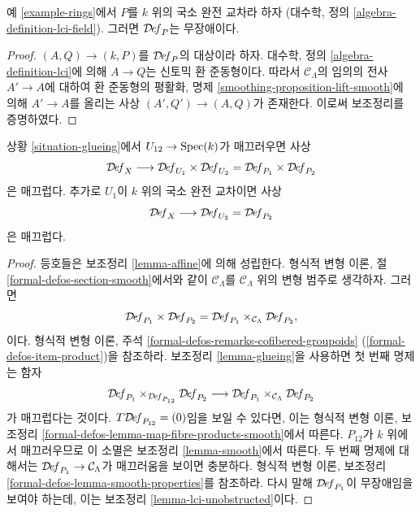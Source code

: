\begin{lemma}
\label{lemma-lci-unobstructed}
예 \ref{example-rings}에서 $P$를 $k$ 위의 국소 완전 교차라 하자
(대수학, 정의 \ref{algebra-definition-lci-field}). 그러면
$\mathcal{D}\!\mathit{ef}_P$는 무장애이다.
\end{lemma}

\begin{proof}
$(A, Q) \to (k, P)$를 $\mathcal{D}\!\mathit{ef}_P$의 대상이라 하자.
대수학, 정의 \ref{algebra-definition-lci}에 의해 $A \to Q$는 신토믹 환
준동형이다. 따라서 $\mathcal{C}_\Lambda$의 임의의 전사 $A' \to A$에
대하여 환 준동형의 평활화, 명제
\ref{smoothing-proposition-lift-smooth}에 의해 $A' \to A$를 올리는 사상
$(A', Q') \to (A, Q)$가 존재한다. 이로써 보조정리를 증명하였다.
\end{proof}

\begin{lemma}
\label{lemma-glueing-smooth}
상황 \ref{situation-glueing}에서 $U_{12} \to \mathop{\mathrm{Spec}}(k)$가 매끄러우면 사상
$$
\mathcal{D}\!\mathit{ef}_X
\longrightarrow
\mathcal{D}\!\mathit{ef}_{U_1} \times \mathcal{D}\!\mathit{ef}_{U_2} =
\mathcal{D}\!\mathit{ef}_{P_1} \times \mathcal{D}\!\mathit{ef}_{P_2}
$$
은 매끄럽다. 추가로 $U_1$이 $k$ 위의 국소 완전 교차이면 사상
$$
\mathcal{D}\!\mathit{ef}_X
\longrightarrow
\mathcal{D}\!\mathit{ef}_{U_2} = \mathcal{D}\!\mathit{ef}_{P_2}
$$
은 매끄럽다.
\end{lemma}

\begin{proof}
등호들은 보조정리 \ref{lemma-affine}에 의해 성립한다. 형식적 변형 이론,
절 \ref{formal-defos-section-smooth}에서와 같이
$\mathcal{C}_\Lambda$를 $\mathcal{C}_\Lambda$ 위의 변형 범주로 생각하자.
그러면
$$
\mathcal{D}\!\mathit{ef}_{P_1} \times \mathcal{D}\!\mathit{ef}_{P_2} =
\mathcal{D}\!\mathit{ef}_{P_1}
\times_{\mathcal{C}_\Lambda}
\mathcal{D}\!\mathit{ef}_{P_2},
$$
이다. 형식적 변형 이론, 주석
\ref{formal-defos-remarks-cofibered-groupoids}
(\ref{formal-defos-item-product})을 참조하라. 보조정리
\ref{lemma-glueing}을 사용하면 첫 번째 명제는 함자
$$
\mathcal{D}\!\mathit{ef}_{P_1}
\times_{\mathcal{D}\!\mathit{ef}_{P_{12}}}
\mathcal{D}\!\mathit{ef}_{P_2}
\longrightarrow
\mathcal{D}\!\mathit{ef}_{P_1}
\times_{\mathcal{C}_\Lambda}
\mathcal{D}\!\mathit{ef}_{P_2}
$$
가 매끄럽다는 것이다. $T\mathcal{D}\!\mathit{ef}_{P_{12}} = (0)$임을 보일 수
있다면, 이는 형식적 변형 이론, 보조정리
\ref{formal-defos-lemma-map-fibre-products-smooth}에서 따른다.
$P_{12}$가 $k$ 위에서 매끄러우므로 이 소멸은 보조정리
\ref{lemma-smooth}에서 따른다. 두 번째 명제에 대해서는
$\mathcal{D}\!\mathit{ef}_{P_1} \to \mathcal{C}_\Lambda$가 매끄러움을 보이면
충분하다. 형식적 변형 이론, 보조정리
\ref{formal-defos-lemma-smooth-properties}를 참조하라. 다시 말해
$\mathcal{D}\!\mathit{ef}_{P_1}$이 무장애임을 보여야 하는데, 이는 보조정리
\ref{lemma-lci-unobstructed}이다.
\end{proof}

